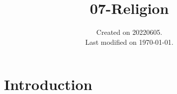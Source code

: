 \documentclass[UTF8]{../RepresentationUniverse}
\begin{document}
\title{07-Religion}
\date{Created on 20220605.\\   Last modified on \today.}
\maketitle
\tableofcontents


\chapter{Introduction}
\end{document}
